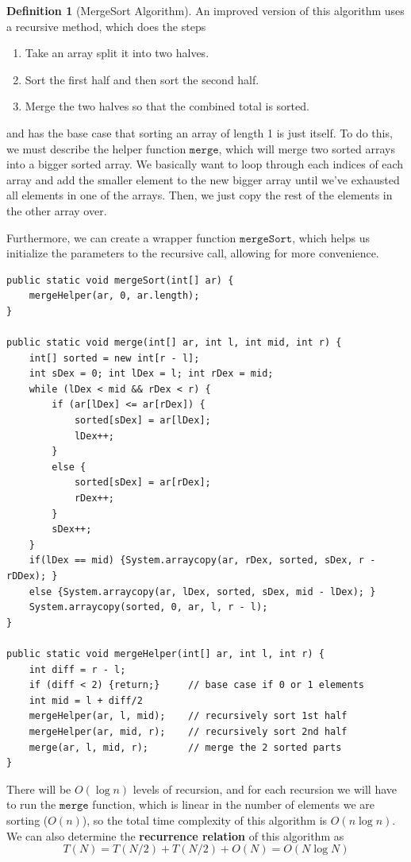 \documentclass{article}
\theoremstyle{definition}
\theoremstyle{remark}
\theoremstyle{definition}
\newtheorem{definition}{Definition}[section]
\begin{document}
\begin{definition}[MergeSort Algorithm]
An improved version of this algorithm uses a recursive method, which does the steps
\begin{enumerate}
    \item Take an array split it into two halves. 
    \item Sort the first half and then sort the second half. 
    \item Merge the two halves so that the combined total is sorted. 
\end{enumerate}
and has the base case that sorting an array of length 1 is just itself. To do this, we must describe the helper function $\texttt{merge}$, which will merge two sorted arrays into a bigger sorted array. We basically want to loop through each indices of each array and add the smaller element to the new bigger array until we've exhausted all elements in one of the arrays. Then, we just copy the rest of the elements in the other array over. 

Furthermore, we can create a wrapper function $\texttt{mergeSort}$, which helps us initialize the parameters to the recursive call, allowing for more convenience. 
\begin{verbatim}
public static void mergeSort(int[] ar) {
    mergeHelper(ar, 0, ar.length); 
}

public static void merge(int[] ar, int l, int mid, int r) {
    int[] sorted = new int[r - l]; 
    int sDex = 0; int lDex = l; int rDex = mid; 
    while (lDex < mid && rDex < r) {
        if (ar[lDex] <= ar[rDex]) {
            sorted[sDex] = ar[lDex]; 
            lDex++; 
        }
        else {
            sorted[sDex] = ar[rDex]; 
            rDex++; 
        }
        sDex++; 
    }
    if(lDex == mid) {System.arraycopy(ar, rDex, sorted, sDex, r - rDDex); }
    else {System.arraycopy(ar, lDex, sorted, sDex, mid - lDex); }
    System.arraycopy(sorted, 0, ar, l, r - l); 
}

public static void mergeHelper(int[] ar, int l, int r) {
    int diff = r - l; 
    if (diff < 2) {return;}     // base case if 0 or 1 elements 
    int mid = l + diff/2 
    mergeHelper(ar, l, mid);    // recursively sort 1st half 
    mergeHelper(ar, mid, r);    // recursively sort 2nd half 
    merge(ar, l, mid, r);       // merge the 2 sorted parts 
}
\end{verbatim}
There will be $O(\log{n})$ levels of recursion, and for each recursion we will have to run the $\texttt{merge}$ function, which is linear in the number of elements we are sorting ($O(n)$), so the total time complexity of this algorithm is $O(n \log{n})$. We can also determine the \textbf{recurrence relation} of this algorithm as
\[T(N) = T(N/2) + T(N/2) + O(N) = O(N \log{N})\]
\end{definition}
\end{document}
